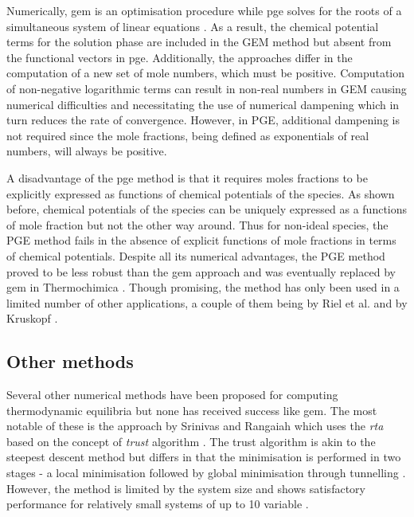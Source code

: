 	Numerically, \gls{gem} is an optimisation procedure while \gls{pge} solves for the roots of a simultaneous system of linear equations \cite{vanZeggeren11}. As a result, the chemical potential terms for the solution phase are included in the GEM method but absent from the functional vectors in \gls{pge}. Additionally, the approaches differ in the computation of a new set of mole numbers, which must be positive. Computation of non-negative logarithmic terms can result in non-real numbers in GEM causing numerical difficulties and necessitating the use of numerical dampening which in turn reduces the rate of convergence. However, in PGE, additional dampening is not required since the mole fractions, being defined as exponentials of real numbers, will always be positive.

	A disadvantage of the \gls{pge} method is that it requires moles fractions to be explicitly expressed as functions of chemical potentials of the species. As shown before, chemical potentials of the species can be uniquely expressed as a functions of mole fraction but not the other way around. Thus for non-ideal species, the PGE method fails in the absence of explicit functions of mole fractions in terms of chemical potentials. Despite all its numerical advantages, the PGE method proved to be less robust than the \gls{gem} approach and was eventually replaced by \gls{gem} in Thermochimica \cite{Bajpai:2021ab}. Though promising, the method has only been used in a limited number of other applications, a couple of them being by Riel et al. \cite{Riel:2022aa} and by Kruskopf \cite{Kruskopf:2018aa}.

	\subsection{Other methods}
	Several other numerical methods have been proposed for computing thermodynamic equilibria but none has received success like \gls{gem}. The most notable of these is the approach by Srinivas and Rangaiah which uses  the \emph{\gls{rta}} based on the concept of \emph{\gls{trust}} algorithm \cite{Srinivas06}. The \gls{trust} algorithm is akin to the steepest descent method but differs in that the minimisation is performed in two stages - a local minimisation followed by global minimisation through tunnelling \cite{Nocedal06}.  However, the method is limited by the system size and shows satisfactory performance for relatively small systems of up to 10 variable \cite{Nocedal06}.

